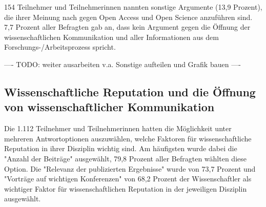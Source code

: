 154 Teilnehmer und Teilnehmerinnen nannten sonstige Argumente (13,9 Prozent), die ihrer Meinung nach gegen Open Access und Open Science anzuführen sind. 7,7 Prozent aller Befragten gab an, dass kein Argument gegen die Öffnung der wissenschaftlichen Kommunikation und aller Informationen aus dem Forschungs-/Arbeitsprozess spricht.

---- TODO: weiter ausarbeiten v.a. Sonstige aufteilen und Grafik bauen ----

\subsection{Wissenschaftliche Reputation und die Öffnung von wissenschaftlicher Kommunikation}

Die 1.112 Teilnehmer und Teilnehmerinnen hatten die Möglichkeit unter mehreren Antwortoptionen auszuwählen, welche Faktoren für wissenschaftliche Reputation in ihrer Disziplin wichtig sind. Am häufigsten wurde dabei die "Anzahl der Beiträge" ausgewählt, 79,8 Prozent aller Befragten wählten diese Option. Die "Relevanz der publizierten Ergebnisse" wurde von 73,7 Prozent und "Vorträge auf wichtigen Konferenzen" von 68,2 Prozent der Wissenschaftler als wichtiger Faktor für wissenschaftlichen Reputation in der jeweiligen Disziplin ausgewählt.

